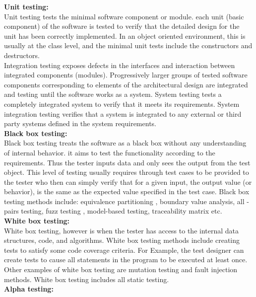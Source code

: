 \textbf{Unit testing:}\\
\hspace*{0.82cm}Unit testing tests the minimal software component or module. each unit (basic component) of the software is tested 
to verify that the detailed design for the unit has been correctly implemented. In an object oriented environment, this is usually 
at the class level, and the minimal unit tests include the constructors and destructors.\\[0.5cm]
\hspace*{0.82cm}Integration testing exposes defects in the interfaces and interaction between integrated components (modules). 
Progressively larger groups of tested software components corresponding to elements of the architectural design are integrated and 
testing until the software works as a system. System testing tests a completely integrated system to verify that it meets its 
requirements. System integration testing verifies that a system is integrated to any external or third party systems defined in 
the system requirements.\\[0.5cm]
\textbf{Black box testing:}\\
\hspace*{0.82cm}Black box testing treats the software as a black box without any understanding of internal behavior. it aims to 
test the functionality according to the requirements. Thus the tester inputs data and only sees the output from the test object. 
This level of testing usually requires through test cases to be provided to the tester who then can simply verify that for a given 
input, the output value (or behavior), is the same as the expected value specified in the test case. Black box testing methods 
include: equivalence partitioning , boundary value analysis, all - pairs testing, fuzz testing , model-based testing, traceability 
matrix etc.\\[0.5cm]
\textbf{White box testing:}\\
\hspace*{0.82cm}White box testing, however is when the tester has access to the internal data structures, code, and algorithms. 
White box testing methods include creating tests to satisfy some code coverage criteria. For Example, the test designer can 
create tests to cause all statements in the program to be executed at least once. Other examples of white box testing are mutation 
testing and fault injection methods. White box testing includes all static testing.\\[0.5cm]
\textbf{Alpha testing:}\\
